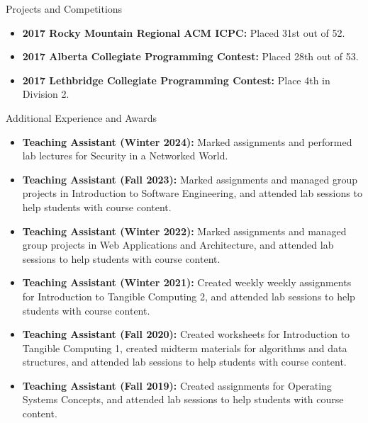 \documentclass[]{mcdowellcv}
\begin{document}
\newpage

\begin{cvsection}{Projects and Competitions}
  \begin{cvsubsection}{}{}{}
    \begin{itemize}
      \item \textbf{2017 Rocky Mountain Regional ACM ICPC:} Placed 31st out of 52.
      \item \textbf{2017 Alberta Collegiate Programming Contest:} Placed 28th out of 53.
      \item \textbf{2017 Lethbridge Collegiate Programming Contest:} Place 4th in Division 2.
    \end{itemize}
  \end{cvsubsection}
\end{cvsection}

\vspace*{-10pt}

\begin{cvsection}{Additional Experience and Awards}
  \begin{cvsubsection}{}{}{}	
    \begin{itemize}
      \item \textbf{Teaching Assistant (Winter 2024):} Marked assignments and performed lab lectures for Security in a Networked World.
      \item \textbf{Teaching Assistant (Fall 2023):} Marked assignments and managed group projects in Introduction to Software Engineering, and attended lab sessions to help students with course content.
      \item \textbf{Teaching Assistant (Winter 2022):} Marked assignments and managed group projects in Web Applications and Architecture, and attended lab sessions to help students with course content.
      \item \textbf{Teaching Assistant (Winter 2021):} Created weekly weekly assignments for Introduction to Tangible Computing 2, and attended lab sessions to help students with course content.
      \item \textbf{Teaching Assistant (Fall 2020):} Created worksheets for Introduction to Tangible Computing 1, created midterm materials for algorithms and data structures, and attended lab sessions to help students with course content.
      \item \textbf{Teaching Assistant (Fall 2019):} Created assignments for Operating Systems Concepts, and attended lab sessions to help students with course content.
    \end{itemize}
  \end{cvsubsection}
\end{cvsection}
\end{document}
